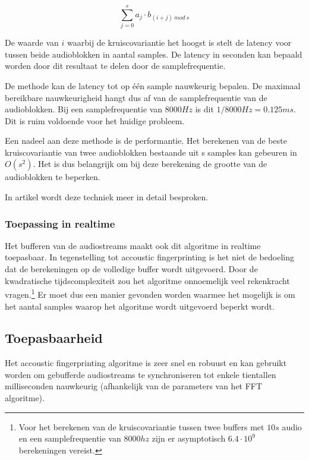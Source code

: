 \begin{equation}
\sum_{j=0}^{s} a_{j} \cdot b_{(i+j)\ mod\ s}
\end{equation}

De waarde van $ i $ waarbij de kruiscovariantie het hoogst is stelt de latency voor tussen beide audioblokken in aantal samples. De latency in seconden kan bepaald worden door dit resultaat te delen door de samplefrequentie.

De methode kan de latency tot op één sample nauwkeurig bepalen. De maximaal bereikbare nauwkeurigheid hangt dus af van de samplefrequentie van de audioblokken. Bij een samplefrequentie van $8000 Hz$ is dit $ 1/8000 Hz = 0.125 ms $. Dit is ruim voldoende voor het huidige probleem.

Een nadeel aan deze methode is de performantie. Het berekenen van de beste kruiscovariantie van twee audioblokken bestaande uit s samples kan gebeuren in  $O(s^{2})$. Het is dus belangrijk om bij deze berekening de grootte van de audioblokken te beperken.

In artikel \cite{six2015multimodal} wordt deze techniek meer in detail besproken.

\subsubsection{Toepassing in realtime}

Het bufferen van de audiostreams maakt ook dit algoritme in realtime toepasbaar. In tegenstelling tot accoustic fingerprinting is het niet de bedoeling dat de berekeningen op de volledige buffer wordt uitgevoerd. Door de kwadratische tijdscomplexiteit zou het algoritme onnoemelijk veel rekenkracht vragen.\footnote{Voor het berekenen van de kruiscovariantie tussen twee buffers met $10s$ audio en een samplefrequentie van $8000hz$ zijn er asymptotisch $ 6.4 \cdot 10^9 $ berekeningen vereist.} Er moet dus een manier gevonden worden waarmee het mogelijk is om het aantal samples waarop het algoritme wordt uitgevoerd beperkt wordt.

\subsection{Toepasbaarheid}
\label{toepasbaarheid}

Het accoustic fingerprinting algoritme is zeer snel en robuust en kan gebruikt worden om gebufferde audiostreams te synchroniseren tot enkele tientallen milliseconden nauwkeurig (afhankelijk van de parameters van het FFT algoritme).

